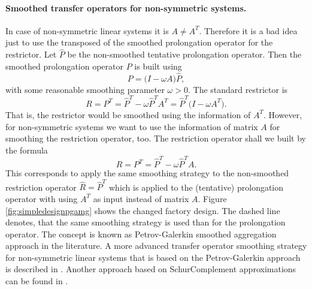 \documentclass[12pt,a4paper]{article}
\begin{document}
\paragraph{Smoothed transfer operators for non-symmetric systems.}
In case of non-symmetric linear systems it is $A\neq A^T$. Therefore it is a bad idea just to use the transposed of the smoothed prolongation operator for the restrictor. Let $\widehat{P}$ be the non-smoothed tentative prolongation operator. Then the smoothed prolongation operator $P$ is built using
\begin{displaymath}
P = \bigl(I-\omega A\bigr) \widehat{P},
\end{displaymath}
with some reasonable smoothing parameter $\omega>0$.
The standard restrictor is 
\begin{displaymath}
R = P^T = \widehat{P}^T - \omega \widehat{P}^T A^T = \widehat{P}^T\bigl(I-\omega A^T\bigr).
\end{displaymath}
That is, the restrictor would be smoothed using the information of $A^T$. However, for non-symmetric systems we want to use the information of matrix $A$ for smoothing the restriction operator, too. The restriction operator shall we built by the formula
\begin{displaymath}
R = P^T = \widehat{P}^T - \omega \widehat{P}^T A.
\end{displaymath}
This corresponds to apply the same smoothing strategy to the non-smoothed restriction operator $\widehat{R}=\widehat{P}^T$ which is applied to the (tentative) prolongation operator with using $A^T$ as input instead of matrix $A$. Figure \ref{fig:simpledesignpgamg} shows the changed factory design. The dashed line denotes, that the same smoothing strategy is used than for the prolongation operator. The concept is known as Petrov-Galerkin smoothed aggregation approach in the literature.
A more advanced transfer operator smoothing strategy for non-symmetric linear systems that is based on the Petrov-Galerkin approach is described in \cite{sala2008}. Another approach based on SchurComplement approximations can be found in \cite{wiesner2013}.
\end{document}
